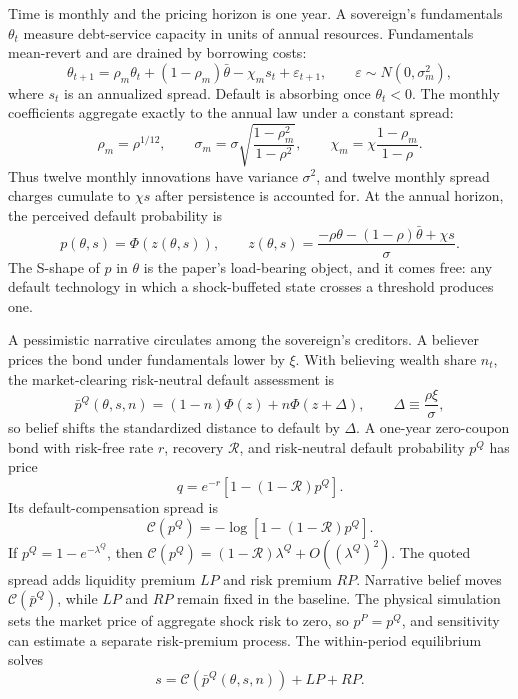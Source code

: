 \documentclass[11pt]{article}
\theoremstyle{definition}
\begin{document}
Time is monthly and the pricing horizon is one year. A sovereign's fundamentals $\theta_t$ measure debt-service capacity in units of annual resources. Fundamentals mean-revert and are drained by borrowing costs:
\begin{equation}
\theta_{t+1} = \rho_m \theta_t + (1 - \rho_m)\bar\theta - \chi_m s_t + \varepsilon_{t+1},
\qquad \varepsilon \sim N(0, \sigma_m^2),
\label{eq:theta-law}
\end{equation}
where $s_t$ is an annualized spread. Default is absorbing once $\theta_t<0$. The monthly coefficients aggregate exactly to the annual law under a constant spread:
\begin{equation}
\rho_m=\rho^{1/12},
\qquad
\sigma_m=\sigma\sqrt{\frac{1-\rho_m^2}{1-\rho^2}},
\qquad
\chi_m=\chi\frac{1-\rho_m}{1-\rho}.
\label{eq:aggregation}
\end{equation}
Thus twelve monthly innovations have variance $\sigma^2$, and twelve monthly spread charges cumulate to $\chi s$ after persistence is accounted for. At the annual horizon, the perceived default probability is
\begin{equation}
p(\theta, s) = \Phi\!\left( z(\theta, s) \right),
\qquad
z(\theta, s) = \frac{-\rho\theta - (1-\rho)\bar\theta + \chi s}{\sigma}.
\label{eq:pdef}
\end{equation}
The S-shape of $p$ in $\theta$ is the paper's load-bearing object, and it comes free: any default technology in which a shock-buffeted state crosses a threshold produces one.

A pessimistic narrative circulates among the sovereign's creditors. A believer prices the bond under fundamentals lower by $\xi$. With believing wealth share $n_t$, the market-clearing risk-neutral default assessment is
\begin{equation}
\bar p^Q(\theta,s,n)=(1-n)\Phi(z)+n\Phi(z+\Delta),
\qquad \Delta \equiv \frac{\rho \xi}{\sigma},
\label{eq:pbar}
\end{equation}
so belief shifts the standardized distance to default by $\Delta$. A one-year zero-coupon bond with risk-free rate $r$, recovery $\mathcal R$, and risk-neutral default probability $p^Q$ has price
\[
q=e^{-r}\left[1-(1-\mathcal R)p^Q\right].
\]
Its default-compensation spread is
\begin{equation}
\mathcal C(p^Q)=-\log\left[1-(1-\mathcal R)p^Q\right].
\label{eq:hazard-price}
\end{equation}
If $p^Q=1-e^{-\lambda^Q}$, then $\mathcal C(p^Q)=(1-\mathcal R)\lambda^Q+O((\lambda^Q)^2)$. The quoted spread adds liquidity premium $LP$ and risk premium $RP$. Narrative belief moves $\mathcal C(\bar p^Q)$, while $LP$ and $RP$ remain fixed in the baseline. The physical simulation sets the market price of aggregate shock risk to zero, so $p^P=p^Q$, and sensitivity can estimate a separate risk-premium process. The within-period equilibrium solves
\begin{equation}
s=\mathcal C\!\left(\bar p^Q(\theta,s,n)\right)+LP+RP.
\label{eq:spread-fixed-point}
\end{equation}
\end{document}
